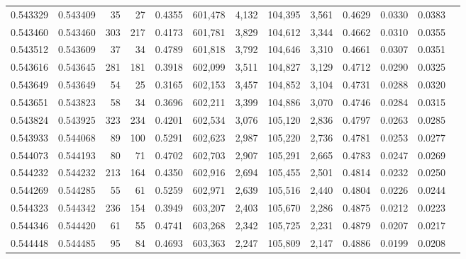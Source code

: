\begin{tabular}{rrrrrrrrrrrrr}
0.543329 & 0.543409 &    35 &    27 &                                     0.4355 & 601,478 &   4,132 & 104,395 &   3,561 & 0.4629 & 0.0330 & 0.0383 \\
0.543460 & 0.543460 &   303 &   217 &                                     0.4173 & 601,781 &   3,829 & 104,612 &   3,344 & 0.4662 & 0.0310 & 0.0355 \\
0.543512 & 0.543609 &    37 &    34 &                                     0.4789 & 601,818 &   3,792 & 104,646 &   3,310 & 0.4661 & 0.0307 & 0.0351 \\
0.543616 & 0.543645 &   281 &   181 &                                     0.3918 & 602,099 &   3,511 & 104,827 &   3,129 & 0.4712 & 0.0290 & 0.0325 \\
0.543649 & 0.543649 &    54 &    25 &                                     0.3165 & 602,153 &   3,457 & 104,852 &   3,104 & 0.4731 & 0.0288 & 0.0320 \\
0.543651 & 0.543823 &    58 &    34 &                                     0.3696 & 602,211 &   3,399 & 104,886 &   3,070 & 0.4746 & 0.0284 & 0.0315 \\
0.543824 & 0.543925 &   323 &   234 &                                     0.4201 & 602,534 &   3,076 & 105,120 &   2,836 & 0.4797 & 0.0263 & 0.0285 \\
0.543933 & 0.544068 &    89 &   100 &                                     0.5291 & 602,623 &   2,987 & 105,220 &   2,736 & 0.4781 & 0.0253 & 0.0277 \\
0.544073 & 0.544193 &    80 &    71 &                                     0.4702 & 602,703 &   2,907 & 105,291 &   2,665 & 0.4783 & 0.0247 & 0.0269 \\
0.544232 & 0.544232 &   213 &   164 &                                     0.4350 & 602,916 &   2,694 & 105,455 &   2,501 & 0.4814 & 0.0232 & 0.0250 \\
0.544269 & 0.544285 &    55 &    61 &                                     0.5259 & 602,971 &   2,639 & 105,516 &   2,440 & 0.4804 & 0.0226 & 0.0244 \\
0.544323 & 0.544342 &   236 &   154 &                                     0.3949 & 603,207 &   2,403 & 105,670 &   2,286 & 0.4875 & 0.0212 & 0.0223 \\
0.544346 & 0.544420 &    61 &    55 &                                     0.4741 & 603,268 &   2,342 & 105,725 &   2,231 & 0.4879 & 0.0207 & 0.0217 \\
0.544448 & 0.544485 &    95 &    84 &                                     0.4693 & 603,363 &   2,247 & 105,809 &   2,147 & 0.4886 & 0.0199 & 0.0208 \\

\end{tabular}
